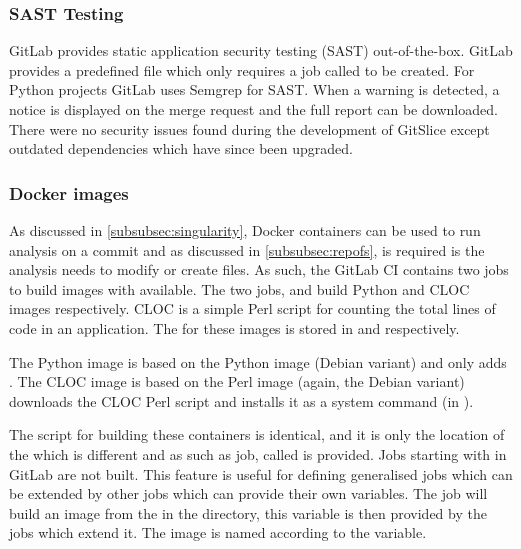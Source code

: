 \documentclass[11pt]{article}
\begin{document}
    \subsubsection{SAST Testing}
    \label{subsubsec:sast}

    GitLab provides static application security testing (SAST) out-of-the-box.
    GitLab provides a predefined  file which only requires a job called  to be created.
    For Python projects GitLab uses Semgrep for SAST\@.
    When a warning is detected, a notice is displayed on the merge request and the full report can be downloaded.
    There were no security issues found during the development of GitSlice except outdated dependencies which have since been upgraded.

    \subsubsection{Docker images}

    As discussed in \autoref{subsubsec:singularity}, Docker containers can be used to run analysis on a commit and as discussed in \autoref{subsubsec:repofs},  is required is the analysis needs to modify or create files.
    As such, the GitLab CI contains two jobs to build images with  available.
    The two jobs,  and  build Python and CLOC images respectively.
    CLOC is a simple Perl script for counting the total lines of code in an application.
    The  for these images is stored in  and  respectively.

    The Python image is based on the Python image (Debian variant) and only adds .
    The CLOC image is based on the Perl image (again, the Debian variant) downloads the CLOC Perl script and installs it as a system command (in ).
    
    The script for building these containers is identical, and it is only the location of the  which is different and as such as job, called  is provided.
    Jobs starting with  in GitLab are not built.
    This feature is useful for defining generalised jobs which can be extended by other jobs which can provide their own variables.
    The  job will build an image from the  in the  directory, this variable is then provided by the jobs which extend it.
    The image is named according to the  variable.
\end{document}
